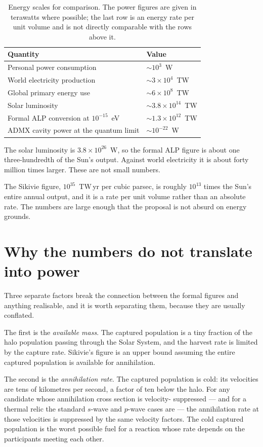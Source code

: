 \begin{table}[H]
\centering
\caption{Energy scales for comparison. The power figures are given in
terawatts where possible; the last row is an energy rate per unit volume
and is not directly comparable with the rows above it.}
\label{tab:energy}
\begin{tabular}{@{}>{\RaggedRight\arraybackslash}p{}l@{}}
\toprule
\textbf{Quantity} & \textbf{Value} \\
\midrule
Personal power consumption & $\sim 10^{3}$~W \\
World electricity production & $\sim 3\times 10^{4}$~TW \\
Global primary energy use & $\sim 6\times 10^{8}$~TW \\
Solar luminosity & $\sim 3.8\times 10^{14}$~TW \\
Formal ALP conversion at $10^{-15}$~eV & $\sim 1.3\times 10^{12}$~TW \\
ADMX cavity power at the quantum limit & $\sim 10^{-22}$~W \\
\bottomrule
\end{tabular}
\end{table}

The solar luminosity is $3.8\times 10^{26}$~W, so the formal ALP figure is
about one three-hundredth of the Sun's output. Against world electricity it
is about forty million times larger. These are not small numbers.

The Sikivie figure, $10^{35}$~TW\,yr per cubic parsec, is roughly
$10^{13}$ times the Sun's entire annual output, and it is a rate per unit
volume rather than an absolute rate. The numbers are large enough that the
proposal is not absurd on energy grounds.

\section{Why the numbers do not translate into power}Three separate factors
break the connection between the formal figures and anything realisable, and
it is worth separating them, because they are usually conflated.

The first is the \emph{available mass}. The captured population is a tiny
fraction of the halo population passing through the Solar System, and the
harvest rate is limited by the capture rate. Sikivie's figure is an upper
bound assuming the entire captured population is available for
annihilation.

The second is the \emph{annihilation rate}. The captured population is cold:
its velocities are tens of kilometres per second, a factor of ten below the
halo. For any candidate whose annihilation cross section is velocity-
suppressed --- and for a thermal relic the standard $s$-wave and
$p$-wave cases are --- the annihilation rate at those velocities is
suppressed by the same velocity factors. The cold captured population is
the worst possible fuel for a reaction whose rate depends on the
participants meeting each other.

